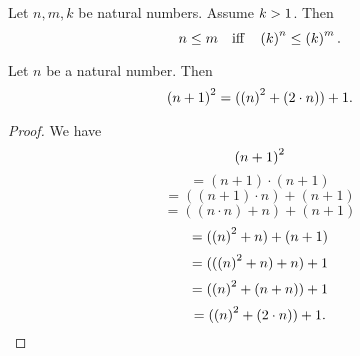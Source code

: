 \documentclass[../arithmetic.tex]{subfiles}
\begin{document}
  \begin{forthel}
    \begin{corollary}
      Let $n, m, k$ be natural numbers.
      Assume $k > 1$.
      Then \[ n \leq m \quad \text{iff} \quad \left(k\right)^{n} \leq \left(k\right)^{m}. \]
    \end{corollary}
  \end{forthel}

  \begin{forthel}
    \begin{proposition}
      Let $n$ be a natural number.
      Then \[ \left(n + 1\right)^{2} = (\left(n\right)^{2} + (2 \cdot n)) + 1. \]
    \end{proposition}
    \begin{proof}
      We have
      \[  \left(n + 1\right)^{2}                       \]
      \[    = (n \plus 1) \cdot (n \plus 1)         \]
      \[    = ((n \plus 1) \cdot n) \plus (n \plus 1)   \]
      \[    = ((n \cdot n) \plus n) \plus (n \plus 1)   \]
      \[    = (\left(n\right)^{2} + n) + (n + 1)         \]
      \[    = ((\left(n\right)^{2} + n) + n) + 1         \]
      \[    = (\left(n\right)^{2} + (n + n)) + 1         \]
      \[    = (\left(n\right)^{2} + (2 \cdot n)) + 1.    \]
    \end{proof}
  \end{forthel}
\end{document}
